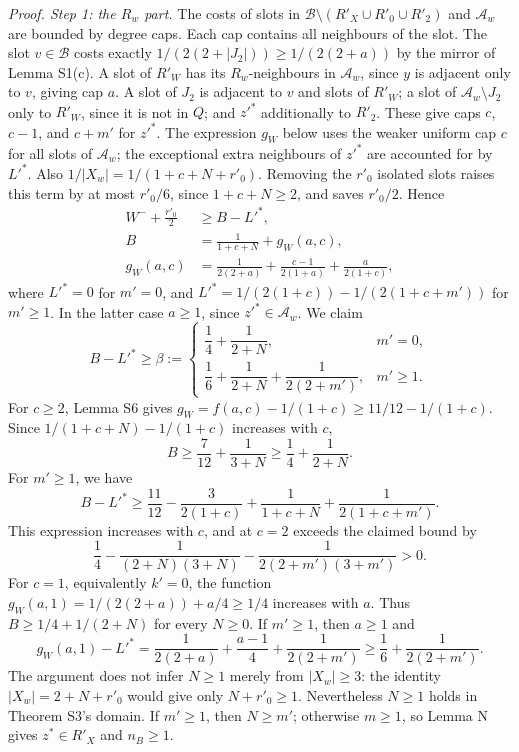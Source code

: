 \emph{Proof. Step 1: the $R_w$ part.}
The costs of slots in $\mathcal B\setminus(R'_X\cup R'_0\cup R'_2)$ and $\mathcal A_w$ are bounded by degree caps. Each cap contains all neighbours of the slot. The slot $v\in\mathcal B$ costs exactly $1/(2(2+|J_2|))\ge1/(2(2+a))$ by the mirror of Lemma S1(c). A slot of $R'_W$ has its $R_w$-neighbours in $\mathcal A_w$, since $y$ is adjacent only to $v$, giving cap $a$. A slot of $J_2$ is adjacent to $v$ and slots of $R'_W$; a slot of $\mathcal A_w\setminus J_2$ only to $R'_W$, since it is not in $Q$; and $z'^*$ additionally to $R'_2$. These give caps $c$, $c-1$, and $c+m'$ for $z'^*$.
The expression $g_W$ below uses the weaker uniform cap $c$ for all slots of $\mathcal A_w$; the exceptional extra neighbours of $z'^*$ are accounted for by $L'^*$.
Also $1/|X_w|=1/(1+c+N+r'_0)$. Removing the $r'_0$ isolated slots raises this term by at most $r'_0/6$, since $1+c+N\ge2$, and saves $r'_0/2$. Hence
\begin{align*}
 W^-+\frac{r'_0}2&\ge B-L'^*,\\
 B&=\frac1{1+c+N}+g_W(a,c),\\
 g_W(a,c)&=\frac1{2(2+a)}+\frac{c-1}{2(1+a)}+\frac a{2(1+c)},
\end{align*}
where $L'^*=0$ for $m'=0$, and
$L'^*=1/(2(1+c))-1/(2(1+c+m'))$ for $m'\ge1$. In the latter case $a\ge1$, since $z'^*\in\mathcal A_w$.
We claim
\[
 B-L'^*\ge\beta:=\begin{cases}
 \dfrac14+\dfrac1{2+N},&m'=0,\\[4pt]
 \dfrac16+\dfrac1{2+N}+\dfrac1{2(2+m')},&m'\ge1.
 \end{cases}
\]
For $c\ge2$, Lemma S6 gives
$g_W=f(a,c)-1/(1+c)\ge11/12-1/(1+c)$.
Since $1/(1+c+N)-1/(1+c)$ increases with $c$,
\[
 B\ge\frac7{12}+\frac1{3+N}\ge\frac14+\frac1{2+N}.
\]
For $m'\ge1$, we have
\[
 B-L'^*\ge\frac{11}{12}-\frac3{2(1+c)}
                 +\frac1{1+c+N}+\frac1{2(1+c+m')}.
\]
This expression increases with $c$, and at $c=2$ exceeds the claimed bound by
\[
 \frac14-\frac1{(2+N)(3+N)}-\frac1{2(2+m')(3+m')}>0.
\]
For $c=1$, equivalently $k'=0$, the function
$g_W(a,1)=1/(2(2+a))+a/4\ge1/4$ increases with $a$.
Thus $B\ge1/4+1/(2+N)$ for every $N\ge0$. If $m'\ge1$, then $a\ge1$ and
\[
 g_W(a,1)-L'^*=\frac1{2(2+a)}+\frac{a-1}4+\frac1{2(2+m')}
 \ge\frac16+\frac1{2(2+m')}.
\]
The argument does not infer $N\ge1$ merely from $|X_w|\ge3$: the identity
$|X_w|=2+N+r'_0$ would give only $N+r'_0\ge1$.
Nevertheless $N\ge1$ holds in Theorem S3's domain. If $m'\ge1$, then $N\ge m'$; otherwise $m\ge1$, so Lemma N gives $z^*\in R'_X$ and $n_B\ge1$.

